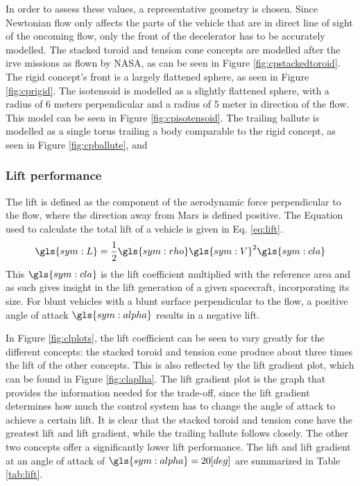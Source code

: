 In order to assess these values, a representative geometry is chosen. Since Newtonian flow only affects the parts of the vehicle that are in direct line of sight of the oncoming flow, only the front of the decelerator has to be accurately modelled. The stacked toroid and tension cone concepts are modelled after the \gls{irve} missions as flown by NASA, as can be seen in Figure \ref{fig:cpstackedtoroid}. The rigid concept's front is a largely flattened sphere, as seen in Figure \ref{fig:cprigid}. The isotensoid is modelled as a slightly flattened sphere, with a radius of 6 meters perpendicular and a radius of 5 meter in direction of the flow. This model can be seen in Figure \ref{fig:cpisotensoid}. The trailing ballute is modelled as a single torus trailing a body comparable to the rigid concept, as seen in Figure \ref{fig:cpballute}, and 



\subsubsection{Lift performance}
The lift is defined as the component of the aerodynamic force perpendicular to the flow, where the direction away from Mars is defined positive. The Equation used to calculate the total lift of a vehicle is given in Eq. \ref{eq:lift}.
\begin{equation}
\gls{sym:L} = \frac{1}{2}\gls{sym:rho}\gls{sym:V}^2\gls{sym:cla}
\label{eq:lift}
\end{equation}
This $\gls{sym:cla}$ is the lift coefficient multiplied with the reference area and as such gives insight in the lift generation of a given spacecraft, incorporating its size. For blunt vehicles with a blunt surface perpendicular to the flow, a positive angle of attack $\gls{sym:alpha}$ results in a negative lift.

In Figure \ref{fig:clplots}, the lift coefficient can be seen to vary greatly for the different concepts: the stacked toroid and tension cone produce about three times the lift of the other concepts. This is also reflected by the lift gradient plot, which can be found in Figure \ref{fig:claplha}. The lift gradient plot is the graph that provides the information needed for the trade-off, since the lift gradient determines how much the control system has to change the angle of attack to achieve a certain lift. It is clear that the stacked toroid and tension cone have the greatest lift and lift gradient, while the trailing ballute follows closely. The other two concepts offer a significantly lower lift performance. The lift and lift gradient at an angle of attack of $\gls{sym:alpha}=20 [deg]$ are summarized in Table \ref{tab:lift}.

